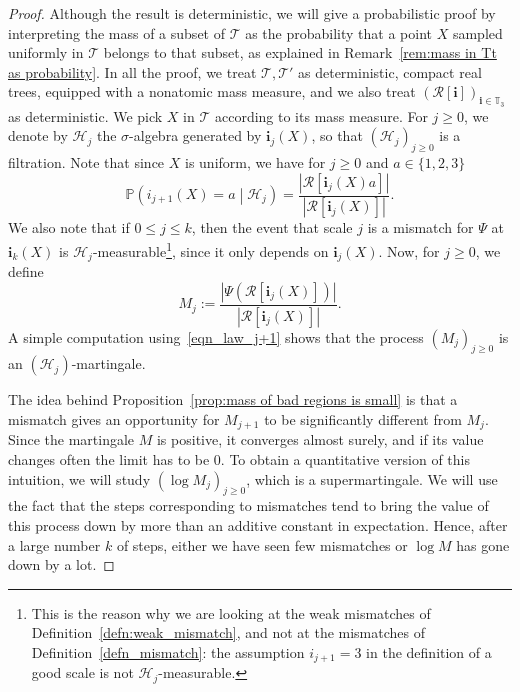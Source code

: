\documentclass[11pt]{article}
\newcommand{\Ppsq}[2]{\mathbb{P} \left(#1\mathrel{}\middle|\mathrel{}#2\right)}
\newcommand{\Tt}{\mathcal{T}}
\newcommand{\Rr}{\mathcal{R}}
\newcommand{\ii}{\mathbf{i}}
\theoremstyle{plain}
\theoremstyle{definition}
\numberwithin{equation}{section}
\begin{document}
\begin{proof}
Although the result is deterministic, we will give a probabilistic proof
by interpreting the mass of a subset of $\Tt$ as the probability that a point $X$ sampled uniformly in $\Tt$ belongs to that subset, as explained in Remark~\ref{rem:mass in Tt as probability}.
In all the proof, we treat $\Tt, \Tt'$ as deterministic, compact real trees, equipped with a nonatomic mass measure, and we also treat $\left( \Rr[\ii] \right)_{\ii \in \mathbb{T}_3}$ as deterministic.
We pick $X$ in $\Tt$ according to its mass measure.
For $j \geq 0$, we denote by $\mathcal{H}_j$ the $\sigma$-algebra generated by $\ii_j(X)$, so that $(\mathcal H_j)_{j\geq 0}$ is a filtration.
Note that since $X$ is uniform, we have for $j \geq 0$ and $a \in \{1,2,3\}$\vspace*{-3pt}
\begin{equation}\label{eqn_law_j+1}
\Ppsq{i_{j+1}(X)=a}{\mathcal H_j} = \frac{\left| \Rr[\ii_j(X) a] \right|}{\left| \Rr[\ii_j(X)] \right|}.
\end{equation}
We also note that if $0 \leq j \leq k$, then the event that scale $j$ is a mismatch for $\Psi$ at $\ii_k(X)$ is $\mathcal{H}_j$-measurable\footnote{This is the reason why we are looking at the weak mismatches of Definition~\ref{defn:weak_mismatch}, and not at the mismatches of Definition~\ref{defn_mismatch}: the assumption $i_{j+1}=3$ in the definition of a good scale is not $\mathcal{H}_j$-measurable.}, since it only depends on $\ii_j(X)$.
Now, for $j \geq 0$, we define
\begin{equation}\label{eqn:martingale}
M_j:=\frac{\left| \Psi \left( \Rr[\ii_j(X)] \right) \right|}{\left| \Rr[\ii_j(X)] \right|}.
\end{equation}
A simple computation using~\eqref{eqn_law_j+1} shows that the process $(M_j)_{j \geq 0}$ is an $(\mathcal H_j)$\nobreakdash-mar\-tingale.

The idea behind Proposition~\ref{prop:mass of bad regions is small} is that a mismatch gives an opportunity for $M_{j+1}$ to be significantly different from $M_j$. Since the martingale $M$ is positive, it converges almost surely, and if its value changes often the limit has to be $0$.
To obtain a quantitative version of this intuition, we will study $(\log M_j)_{j \geq 0}$, which is a supermartingale. We will use the fact that the steps corresponding to mismatches tend to bring the value of this process down by more than an additive constant in expectation. Hence, after a large number $k$ of steps, either we have seen few mismatches or $\log M$ has gone down by a lot.


\end{proof}
\end{document}
